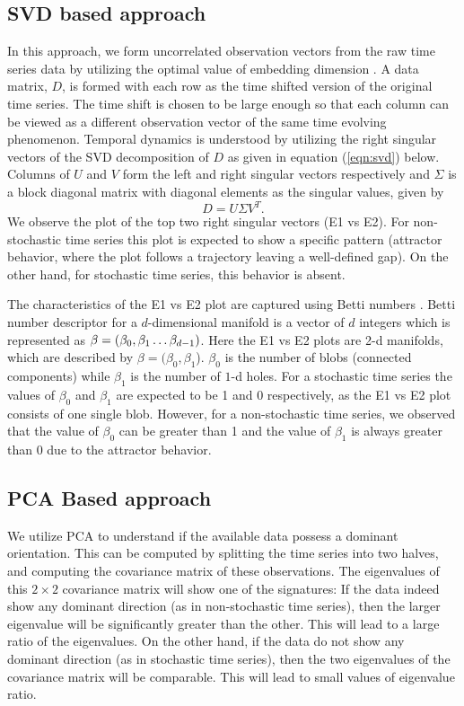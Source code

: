 \documentclass[10pt,conference]{IEEEtran}
\begin{document}
\subsection{SVD based approach}
In this approach, we form uncorrelated observation vectors from the raw time series data by utilizing the optimal value of embedding dimension \cite{misra2006}. A data matrix, $D$, is formed with each row  as the  time shifted version of the original time series. The time shift is chosen to be large enough so that each column can be viewed as a different observation vector of the same time evolving phenomenon. Temporal dynamics is understood by utilizing the right singular vectors of the SVD decomposition of $D$ as given in equation (\ref{eqn:svd}) below. Columns of $U$ and $V$  form the left and right singular vectors respectively and $\Sigma$ is a block diagonal matrix with diagonal elements as the singular values, given by
\begin{equation}
D = U \Sigma V^T.
\label{eqn:svd}
\end{equation}
We observe the plot of the top two right singular vectors (E1 vs E2). For non-stochastic time series this plot is expected to show a specific pattern (attractor behavior, where the plot follows a trajectory leaving a well-defined gap). On the other hand, for stochastic time series, this behavior is absent.

The characteristics of the E1 vs E2 plot are captured using Betti numbers \cite{jmlr}. Betti number descriptor for a $d$-dimensional manifold is a vector of $d$ integers which is represented as $\beta = (\beta_0, \beta_1 \mathellipsis \beta_{d-1})$. Here the E1 vs E2 plots are 2-d manifolds, which are described by  $\beta=(\beta_{0}, \beta_{1}$).  $\beta_{0}$ is the number of blobs (connected components) while $\beta_1$ is the number of $1$-d holes. For a stochastic time series the values of $\beta_{0}$  and $\beta_1$ are expected to be 1 and 0 respectively, as the E1 vs E2 plot consists of one single blob. However, for a non-stochastic time series, we observed that the value of $\beta_{0}$ can be greater than 1 and the value of $\beta_1$ is always greater than 0 due to the attractor behavior.


\subsection{PCA Based approach}
We utilize PCA to understand if the available data possess a dominant orientation. This can be computed by splitting the time series into two halves, and computing the covariance matrix of these observations. The eigenvalues of this $2 \times 2$ covariance matrix will show one of the signatures: If the data indeed show any dominant direction (as in non-stochastic time series), then the larger eigenvalue will be significantly greater than the other. This will lead to a large ratio of the eigenvalues. On the other hand, if the data do not show any dominant direction (as in stochastic time series), then the two eigenvalues of the covariance matrix will be comparable. This will lead to small values of eigenvalue ratio.
\end{document}
